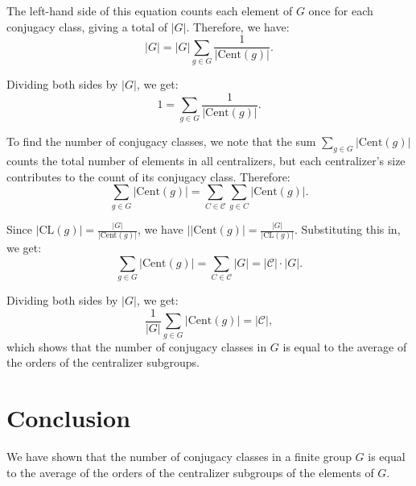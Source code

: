 \documentclass[12pt]{amsart}
\theoremstyle{definition}
\numberwithin{equation}{section}
\begin{document}
\begin{exercise}{2}
    The left-hand side of this equation counts each element of \(G\) once for each conjugacy class, giving a total of \(|G|\). Therefore, we have:
    \[
    |G| = |G| \sum_{g \in G} \frac{1}{|\text{Cent}(g)|}.
    \]

    Dividing both sides by \(|G|\), we get:
    \[
    1 = \sum_{g \in G} \frac{1}{|\text{Cent}(g)|}.
    \]

    To find the number of conjugacy classes, we note that the sum \(\sum_{g \in G} |\text{Cent}(g)|\) counts the total number of elements in all centralizers, but each centralizer's size contributes to the count of its conjugacy class. Therefore:
    \[
    \sum_{g \in G} |\text{Cent}(g)| = \sum_{C \in \mathcal{C}} \sum_{g \in C} |\text{Cent}(g)|.
    \]

    Since \(|\text{CL}(g)| = \frac{|G|}{|\text{Cent}(g)|}\), we have \(||\text{Cent}(g)| = \frac{|G|}{|\text{CL}(g)|}\). Substituting this in, we get:
    \[
    \sum_{g \in G} |\text{Cent}(g)| = \sum_{C \in \mathcal{C}} |G| = |\mathcal{C}| \cdot |G|.
    \]

    Dividing both sides by \(|G|\), we get:
    \[
    \frac{1}{|G|} \sum_{g \in G} |\text{Cent}(g)| = |\mathcal{C}|,
    \]
    which shows that the number of conjugacy classes in \(G\) is equal to the average of the orders of the centralizer subgroups.

    \section*{Conclusion}
    We have shown that the number of conjugacy classes in a finite group \(G\) is equal to the average of the orders of the centralizer subgroups of the elements of \(G\).

\end{exercise}
\newpage
\end{document}

